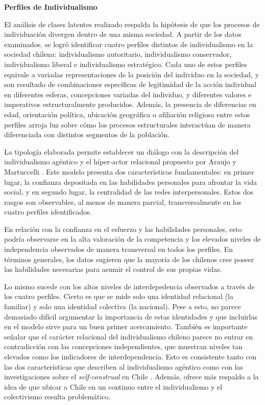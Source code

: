 \documentclass[12pt,oneside]{templates/facsothesis}
\begin{document}
\textbf{Perfiles de Individualismo}

El análisis de clases latentes realizado respalda la hipótesis de que los procesos de individuación divergen dentro de una misma sociedad. A partir de los datos examinados, se logró identificar cuatro perfiles distintos de individualismo en la sociedad chilena: individualismo autoritario, individualismo conservador, individualismo liberal e individualismo estratégico. Cada uno de estos perfiles equivale a variadas representaciones de la posición del individuo en la sociedad, y son resultado de combinaciones específicas de legitimidad de la acción individual en diferentes esferas, concepciones variadas del individuo, y diferentes valores e imperativos estructuralmente producidos. Además, la presencia de diferencias en edad, orientación política, ubicación geográfica o afiliación religiosa entre estos perfiles arroja luz sobre cómo los procesos estructurales interactúan de manera diferenciada con distintos segmentos de la población.

La tipología elaborada permite establecer un diálogo con la descripción del individualismo agéntico y el híper-actor relacional propuesto por Araujo y Martuccelli \citeyearpar{araujo2020}. Este modelo presenta dos características fundamentales: en primer lugar, la confianza depositada en las habilidades personales para afrontar la vida social, y en segundo lugar, la centralidad de las redes interpersonales. Estos dos rasgos son observables, al menos de manera parcial, transversalmente en los cuatro perfiles identificados.

En relación con la confianza en el esfuerzo y las habilidades personales, esto podría observarse en la alta valoración de la competencia y los elevados niveles de independencia observados de manera transversal en todos los perfiles. En términos generales, los datos sugieren que la mayoría de los chilenos cree poseer las habilidades necesarias para asumir el control de sus propias vidas.

Lo mismo sucede con los altos niveles de interdepedencia observados a través de los cuatro perfiles. Cierto es que se mide solo una identidad relacional (la familiar) y solo una identidad colectiva (la nacional). Pese a esto, no parece demasiado difícil argumentar la importancia de estas identidades y que incluirlas en el modelo sirve para un buen primer acercamiento. También es importante señalar que el carácter relacional del individualismo chileno parece no entrar en contradicción con las concepciones independientes, que muestran niveles tan elevados como los indicadores de interdependencia. Esto es consistente tanto con las dos características que describen al individualismo agéntico \citep{araujo2020} como con las investigaciones sobre el \emph{self-construal} en Chile \citep{benavides2020, kolstad2009}. Además, ofrece más respaldo a la idea de que ubicar a Chile en un continuo entre el individualismo y el colectivismo resulta problemático.
\end{document}
